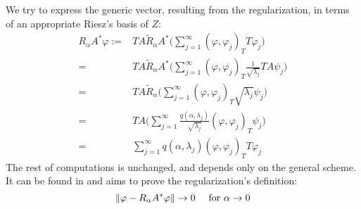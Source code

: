\documentclass[10pt, a4paper, twoside, openright]{book}
\theoremstyle{definition}
\theoremstyle{plain}
\theoremstyle{plain}
\theoremstyle{plain}
\theoremstyle{plain}
\theoremstyle{plain}
\theoremstyle{plain}
\theoremstyle{plain}
\theoremstyle{plain}
\let\phi\varphi
\begin{document}
\begin{center}
\end{center}
We try to express the generic vector, resulting from the regularization, in terms of an appropriate Riesz's basis of $Z$:
\begin{align}
  R_\alpha A^*\phi :=& TA\tilde{R}_\alpha A^*\Big(\sum_{j=1}^\infty(\phi,\phi_j)_TT\phi_j\Big) \\
  =& TA\tilde{R}_\alpha A^*\Big(\sum_{j=1}^\infty(\phi,\phi_j)_T\frac{1}{\sqrt{\lambda_j}}TA\psi_j\Big) \\
  =& TA\tilde{R}_\alpha \Big(\sum_{j=1}^\infty(\phi,\phi_j)_T\sqrt{\lambda_j}\psi_j\Big) \\
  =& TA\Big(\sum_{j=1}^\infty\frac{q(\alpha,\lambda_j)}{\sqrt{\lambda_j}}(\phi,\phi_j)_T\psi_j\Big) \\
  =&\sum_{j=1}^\infty q(\alpha,\lambda_j)(\phi,\phi_j)_TT\phi_j
\end{align}
The rest of computations is unchanged, and depends only on the general scheme. It can be found in \cite{arens:why} and aims to prove the regularization's definition:
\begin{equation}
 \|\phi - R_\alpha A^*\phi\|\to 0 \quad \textup{ for }\alpha\to 0
\end{equation}
\end{document}
